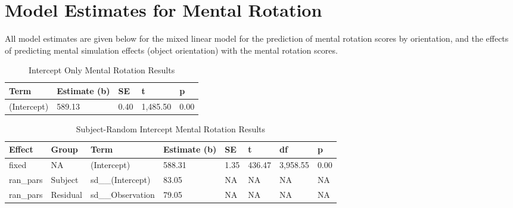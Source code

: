 \documentclass[
  man,floatsintext]{apa7}
\begin{document}
\hypertarget{model-estimates-for-mental-rotation}{%
\section{Model Estimates for Mental Rotation}\label{model-estimates-for-mental-rotation}}

All model estimates are given below for the mixed linear model for the prediction of mental rotation scores by orientation, and the effects of predicting mental simulation effects (object orientation) with the mental rotation scores.

\newpage

\begin{table}[tbp]

\begin{center}
\begin{threeparttable}

\caption{\label{tab:intercept_e}Intercept Only Mental Rotation Results}

\begin{tabular}{lllll}
\toprule
Term & Estimate (b) & SE & t & p\\
\midrule
(Intercept) & 589.13 & 0.40 & 1,485.50 & 0.00\\
\bottomrule
\end{tabular}

\end{threeparttable}
\end{center}

\end{table}

\begin{table}[tbp]

\begin{center}
\begin{threeparttable}

\caption{\label{tab:subject_e}Subject-Random Intercept Mental Rotation Results}

\begin{tabular}{llllllll}
\toprule
Effect & Group & Term & Estimate (b) & SE & t & df & p\\
\midrule
fixed & NA & (Intercept) & 588.31 & 1.35 & 436.47 & 3,958.55 & 0.00\\
ran\_pars & Subject & sd\_\_(Intercept) & 83.05 & NA & NA & NA & NA\\
ran\_pars & Residual & sd\_\_Observation & 79.05 & NA & NA & NA & NA\\
\bottomrule
\end{tabular}

\end{threeparttable}
\end{center}

\end{table}
\end{document}
